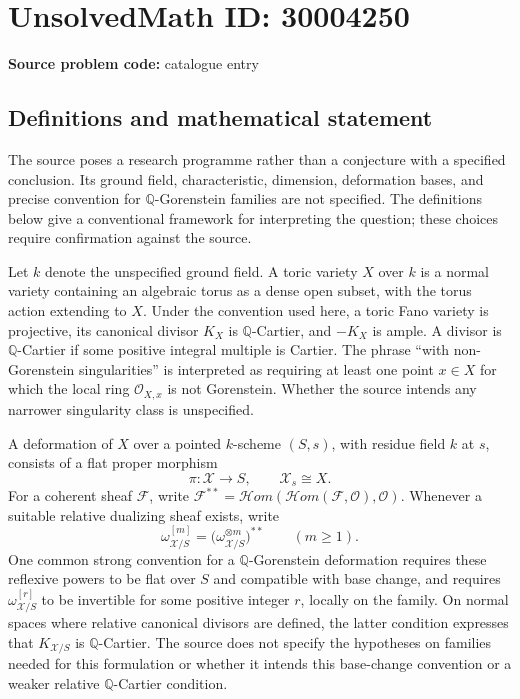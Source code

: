 \documentclass[11pt]{article}
\begin{document}
\section*{UnsolvedMath ID: 30004250}
\textbf{Source problem code:} catalogue entry
\subsection{Definitions and mathematical statement}
The source poses a research programme rather than a conjecture with a specified conclusion. Its ground field, characteristic, dimension, deformation bases, and precise convention for \(\mathbb Q\)-Gorenstein families are not specified. The definitions below give a conventional framework for interpreting the question; these choices require confirmation against the source.

Let \(k\) denote the unspecified ground field. A toric variety \(X\) over \(k\) is a normal variety containing an algebraic torus as a dense open subset, with the torus action extending to \(X\). Under the convention used here, a toric Fano variety is projective, its canonical divisor \(K_X\) is \(\mathbb Q\)-Cartier, and \(-K_X\) is ample. A divisor is \(\mathbb Q\)-Cartier if some positive integral multiple is Cartier. The phrase ``with non-Gorenstein singularities'' is interpreted as requiring at least one point \(x\in X\) for which the local ring \(\mathcal O_{X,x}\) is not Gorenstein. Whether the source intends any narrower singularity class is unspecified.

A deformation of \(X\) over a pointed \(k\)-scheme \((S,s)\), with residue field \(k\) at \(s\), consists of a flat proper morphism
\[
\pi\colon\mathcal X\longrightarrow S,
\qquad \mathcal X_s\cong X.
\]
For a coherent sheaf \(\mathcal F\), write \(\mathcal F^{**}=\mathcal H om(\mathcal H om(\mathcal F,\mathcal O),\mathcal O)\). Whenever a suitable relative dualizing sheaf exists, write
\[
\omega_{\mathcal X/S}^{[m]}=
\bigl(\omega_{\mathcal X/S}^{\otimes m}\bigr)^{**}
\qquad(m\geq 1).
\]
One common strong convention for a \(\mathbb Q\)-Gorenstein deformation requires these reflexive powers to be flat over \(S\) and compatible with base change, and requires \(\omega_{\mathcal X/S}^{[r]}\) to be invertible for some positive integer \(r\), locally on the family. On normal spaces where relative canonical divisors are defined, the latter condition expresses that \(K_{\mathcal X/S}\) is \(\mathbb Q\)-Cartier. The source does not specify the hypotheses on families needed for this formulation or whether it intends this base-change convention or a weaker relative \(\mathbb Q\)-Cartier condition.
\end{document}
